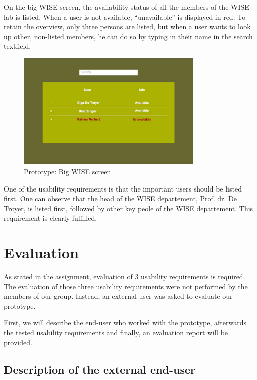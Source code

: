 \documentclass[11pt, a4paper,svglistings]{report}
\begin{document}
On the big WISE screen, the availability status of all the members of the WISE lab is listed. When a user is not available, ``unavailable'' is displayed in red. To retain the overview, only three persons are listed, but when a user wants to look up other, non-listed members, he can do so by typing in their name in the search textfield.

\begin{figure}[H]
\centering
    \includegraphics[width=0.8\textwidth]{Prototypes/WISE.png}
  \caption{Prototype: Big WISE screen}
\end{figure}
One of the usability requirements is that the important users should be listed first. One can observe that the head of the WISE departement, Prof. dr. De Troyer, is listed first, followed by other key peole of the WISE departement. This requirement is clearly fulfilled.



\chapter{Evaluation}

As stated in the assignment, evaluation of 3 usability requirements is required. The evaluation of those three usability requirements were not performed by the members of our group. Instead, an external user was asked to evaluate our prototype.

First, we will describe the end-user who worked with the prototype, afterwards the tested usability requirements and finally, an evaluation report will be provided.

\section{Description of the external end-user}
\end{document}
